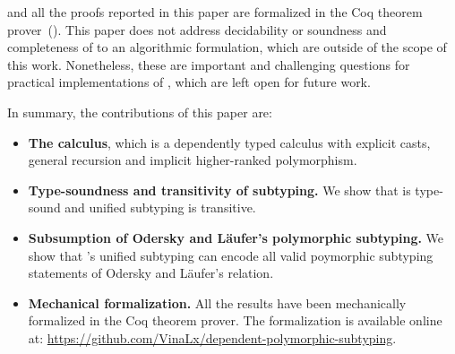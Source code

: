 \name and all the proofs reported in this paper are formalized in the Coq theorem
prover~(\citeauthor{coqsite}).
This paper does not address decidability or soundness and completeness of \name to an
algorithmic formulation, which are outside of the scope of this work.
Nonetheless, these are important and challenging
questions for practical implementations of \name, which are left open for future work.

In summary, the contributions of this paper are:

\begin{itemize}

\item {\bf The \name calculus}, which is a dependently typed calculus with explicit casts,
  general recursion and implicit higher-ranked polymorphism.

\item {\bf Type-soundness and transitivity of subtyping.} We show that \name
  is type-sound and unified subtyping is transitive.

\item {\bf Subsumption of Odersky and L\"aufer's polymorphic subtyping.} We show that \name's
  unified subtyping can encode all valid poymorphic subtyping statements of Odersky and L\"aufer's
  relation.

\item {\bf Mechanical formalization.} All the results have been mechanically
  formalized in the Coq theorem prover. The formalization is available online at:
  \url{https://github.com/VinaLx/dependent-polymorphic-subtyping}.

\end{itemize}
